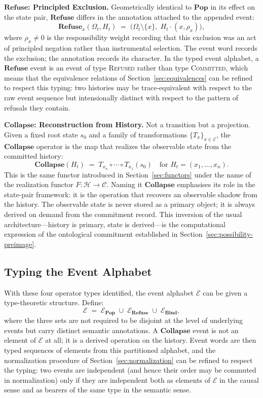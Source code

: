 \documentclass[12pt]{article}
\theoremstyle{plain}
\theoremstyle{definition}
\theoremstyle{remark}
\begin{document}
\medskip
\noindent\textbf{$\mathbf{Refuse}$: Principled Exclusion.}
Geometrically identical to $\mathbf{Pop}$ in its effect on the state pair,
$\mathbf{Refuse}$ differs in the annotation attached to the appended event:
\[
  \mathbf{Refuse}_x(\Omega_t, H_t) \;=\;
  \bigl(\Omega_t \setminus \{x\},\; H_t \cdot (x, \rho_x)\bigr),
\]
where $\rho_x \neq 0$ is the responsibility weight recording that this
exclusion was an act of principled negation rather than instrumental
selection.  The event word records the exclusion; the annotation records its
character.  In the typed event alphabet, a $\mathbf{Refuse}$ event is an event
of type \textsc{Refused} rather than type \textsc{Committed}, which means that
the equivalence relations of Section~\ref{sec:equivalences} can be refined to
respect this typing: two histories may be trace-equivalent with respect to the
raw event sequence but intensionally distinct with respect to the pattern of
refusals they contain.

\medskip
\noindent\textbf{$\mathbf{Collapse}$: Reconstruction from History.}
Not a transition but a projection.  Given a fixed root state $s_0$ and a
family of transformations $\{T_x\}_{x \in \mathcal{E}}$, the $\mathbf{Collapse}$
operator is the map that realizes the observable state from the committed
history:
\[
  \mathbf{Collapse}(H_t) \;=\; T_{x_n} \circ \cdots \circ T_{x_1}(s_0)
  \quad\text{for } H_t = (x_1, \ldots, x_n).
\]
This is the same functor introduced in Section~\ref{sec:functors} under the
name of the realization functor $F : \mathcal{H} \to \mathcal{C}$.  Naming it
$\mathbf{Collapse}$ emphasises its role in the state-pair framework: it is the
operation that recovers an observable shadow from the history.  The observable
state is never stored as a primary object; it is always derived on demand from
the commitment record.  This inversion of the usual architecture---history is
primary, state is derived---is the computational expression of the ontological
commitment established in Section~\ref{sec:possibility-preimage}.

\subsection{Typing the Event Alphabet}

With these four operator types identified, the event alphabet $\mathcal{E}$ can
be given a type-theoretic structure.  Define:
\[
  \mathcal{E} \;=\; \mathcal{E}_{\mathbf{Pop}} \;\cup\;
                    \mathcal{E}_{\mathbf{Refuse}} \;\cup\;
                    \mathcal{E}_{\mathbf{Bind}},
\]
where the three sets are not required to be disjoint at the level of underlying
events but carry distinct semantic annotations.  A $\mathbf{Collapse}$
event is not an element of $\mathcal{E}$ at all; it is a derived operation on
the history.  Event words are then typed sequences of elements from this
partitioned alphabet, and the normalization procedure of
Section~\ref{sec:normalization} can be refined to respect the typing: two
events are independent (and hence their order may be commuted in normalization)
only if they are independent both as elements of $\mathcal{E}$ in the causal
sense and as bearers of the same type in the semantic sense.
\end{document}
